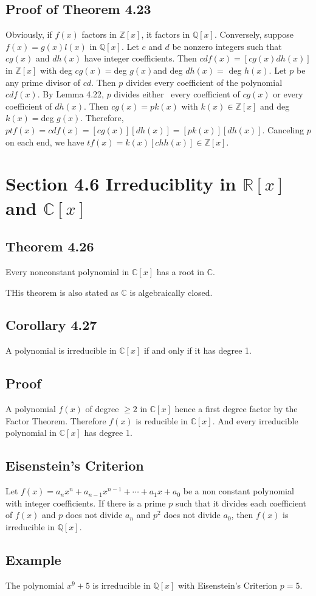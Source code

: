\documentclass{article}
\begin{document}
\subsection*{Proof of Theorem 4.23}
Obviously, if $f(x)$ factors in $\mathbb{Z}[x]$, it factors in $\mathbb{Q}[x]$. Conversely, suppose
$f(x)= g(x)l(x)$ in $\mathbb{Q}[x]$. Let $c$ and $d$ be nonzero integers such that $cg(x)$
and $dh(x)$ have integer coefficients. Then $cdf(x) = [cg(x)dh(x)]$ in $\mathbb{Z}[x]$
with deg $cg(x) = $deg $g(x)$and deg $dh(x) =$ deg $h(x)$. Let $p$ be any prime
divisor of $cd$. Then $p$ divides every coefficient of the polynomial $cdf(x)$. By Lemma 4.22, $p$ divides either~ every coefficient of $cg(x)$
or every coefficient of $dh(x)$. Then $cg(x) = pk(x)$ with
$k(x) \in \mathbb{Z}[x]$ and deg $k(x) = $deg $g(x)$. Therefore, $ptf(x) = cdf(x) =
[cg(x)][dh(x)] = [pk(x)][dh(x)]$. Canceling $p$ on each end, we have
$tf(x) = k(x)[chh(x)] \in \mathbb{Z}[x]$.


\section*{Section 4.6 Irreduciblity in $\mathbb{R}[x]$ and $\mathbb{C}[x]$}

\subsection*{Theorem 4.26}
Every nonconstant polynomial in $\mathbb{C}[x]$ has a root in $\mathbb{C}$.

THis theorem is also stated as $\mathbb{C}$ is algebraically closed. 

\subsection*{Corollary 4.27} A polynomial is irreducible in $\mathbb{C}[x]$ if and only if it has degree 1.

\subsection*{Proof}
A polynomial $f(x)$ of degree $\geq 2$ in $\mathbb{C}[x]$ hence a first degree factor by the Factor Theorem.
Therefore $f(x)$ is reducible in $\mathbb{C}[x]$. And every irreducible polynomial in $\mathbb{C}[x]$ has degree 1.

\subsection*{Eisenstein's Criterion}
Let $f(x) = a_nx^n + a_{n-1}x^{n-1} + \cdots + a_1x + a_0$ be a non constant polynomial with integer coefficients.
If there is a prime $p$ such that it divides each coefficient of $f(x)$ and $p$ does not divide $a_n$ and $p^2$ does not divide $a_0$, then $f(x)$ is irreducible in $\mathbb{Q}[x]$.

\subsection*{Example}
The polynomial $x^9 +5$ is irreducible in $\mathbb{Q}[x]$ with Eisenstein's Criterion $p = 5$.
\end{document}
